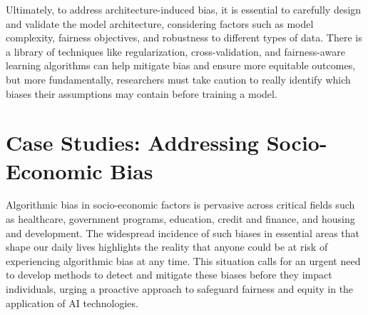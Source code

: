 \documentclass[10pt]{article}
\begin{document}
    Ultimately, to address architecture-induced bias, it is essential to carefully design and validate the model architecture, considering factors such as model complexity, fairness objectives, and robustness to different types of data. There is a library of techniques like regularization, cross-validation, and fairness-aware learning algorithms can help mitigate bias and ensure more equitable outcomes, but more fundamentally, researchers must take caution to really identify which biases their assumptions may contain before training a model. 

\section{Case Studies: Addressing Socio-Economic Bias}

  Algorithmic bias in socio-economic factors is pervasive across critical fields such as healthcare, government programs, education, credit and finance, and housing and development. The widespread incidence of such biases in essential areas that shape our daily lives highlights the reality that anyone could be at risk of experiencing algorithmic bias at any time. This situation calls for an urgent need to develop methods to detect and mitigate these biases before they impact individuals, urging a proactive approach to safeguard fairness and equity in the application of AI technologies.
\end{document}
